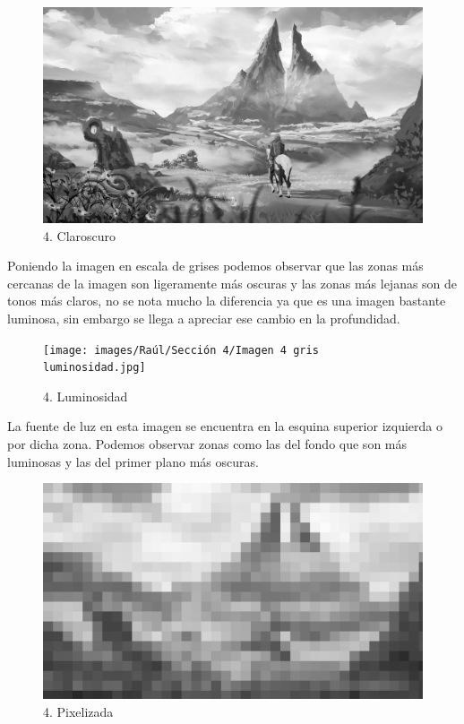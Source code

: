 \documentclass[12pt]{article}
\begin{document}
\begin{figure}[H]
      \centering
      \includegraphics[scale=0.1]{images/Raúl/Sección 4/Imagen 4 gris.jpg}
      \caption{\small 4. Claroscuro}
\end{figure} 

Poniendo la imagen en escala de grises podemos observar que las zonas más cercanas de la imagen son ligeramente más oscuras y las zonas más lejanas son de tonos más claros, no se nota mucho la diferencia ya que es una imagen bastante luminosa, sin embargo se llega a apreciar ese cambio en la profundidad.

\begin{figure}[H]
      \centering
      \texttt{[image: images/Raúl/Sección 4/Imagen 4 gris luminosidad.jpg]}
      \caption{\small 4. Luminosidad}
\end{figure}

La fuente de luz en esta imagen se encuentra en la esquina superior izquierda o por dicha zona. Podemos observar zonas como las del fondo que son más luminosas y las del primer plano más oscuras.

\begin{figure}[H]
      \centering
      \includegraphics[scale=0.1]{images/Raúl/Sección 4/Imagen 4 gris pixel.jpg}
      \caption{\small 4. Pixelizada}
\end{figure}
\end{document}
